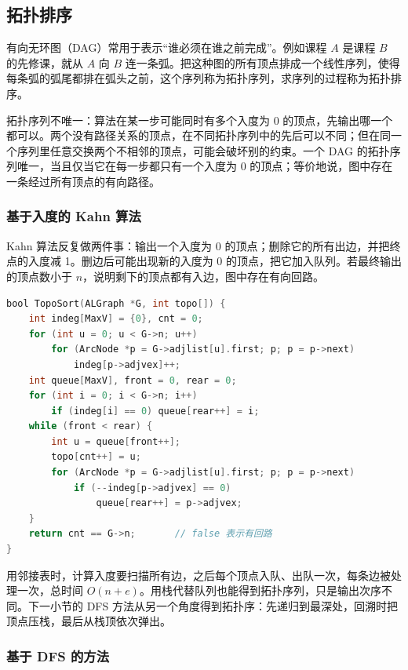 \subsection{拓扑排序}

有向无环图（DAG）常用于表示“谁必须在谁之前完成”。例如课程 $A$ 是课程 $B$ 的先修课，就从 $A$ 向 $B$ 连一条弧。把这种图的所有顶点排成一个线性序列，使得每条弧的弧尾都排在弧头之前，这个序列称为拓扑序列，求序列的过程称为拓扑排序。

拓扑序列不唯一：算法在某一步可能同时有多个入度为 0 的顶点，先输出哪一个都可以。两个没有路径关系的顶点，在不同拓扑序列中的先后可以不同；但在同一个序列里任意交换两个不相邻的顶点，可能会破坏别的约束。一个 DAG 的拓扑序列唯一，当且仅当它在每一步都只有一个入度为 0 的顶点；等价地说，图中存在一条经过所有顶点的有向路径。

\subsubsection{基于入度的 Kahn 算法}

Kahn 算法反复做两件事：输出一个入度为 0 的顶点；删除它的所有出边，并把终点的入度减 1。删边后可能出现新的入度为 0 的顶点，把它加入队列。若最终输出的顶点数小于 $n$，说明剩下的顶点都有入边，图中存在有向回路。

\begin{lstlisting}[language=C]
bool TopoSort(ALGraph *G, int topo[]) {
    int indeg[MaxV] = {0}, cnt = 0;
    for (int u = 0; u < G->n; u++)
        for (ArcNode *p = G->adjlist[u].first; p; p = p->next)
            indeg[p->adjvex]++;
    int queue[MaxV], front = 0, rear = 0;
    for (int i = 0; i < G->n; i++)
        if (indeg[i] == 0) queue[rear++] = i;
    while (front < rear) {
        int u = queue[front++];
        topo[cnt++] = u;
        for (ArcNode *p = G->adjlist[u].first; p; p = p->next)
            if (--indeg[p->adjvex] == 0)
                queue[rear++] = p->adjvex;
    }
    return cnt == G->n;       // false 表示有回路
}
\end{lstlisting}

用邻接表时，计算入度要扫描所有边，之后每个顶点入队、出队一次，每条边被处理一次，总时间 $O(n+e)$。用栈代替队列也能得到拓扑序列，只是输出次序不同。下一小节的 DFS 方法从另一个角度得到拓扑序：先递归到最深处，回溯时把顶点压栈，最后从栈顶依次弹出。

\subsubsection{基于 DFS 的方法}

